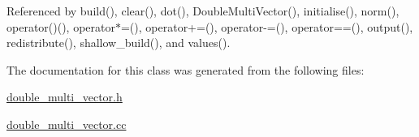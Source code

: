 Referenced by build(), clear(), dot(), Double\+Multi\+Vector(), initialise(), norm(), operator()(), operator$\ast$=(), operator+=(), operator-\/=(), operator==(), output(), redistribute(), shallow\+\_\+build(), and values().



The documentation for this class was generated from the following files\+:\begin{DoxyCompactItemize}
\item 
\hyperlink{double__multi__vector_8h}{double\+\_\+multi\+\_\+vector.\+h}\item 
\hyperlink{double__multi__vector_8cc}{double\+\_\+multi\+\_\+vector.\+cc}\end{DoxyCompactItemize}
